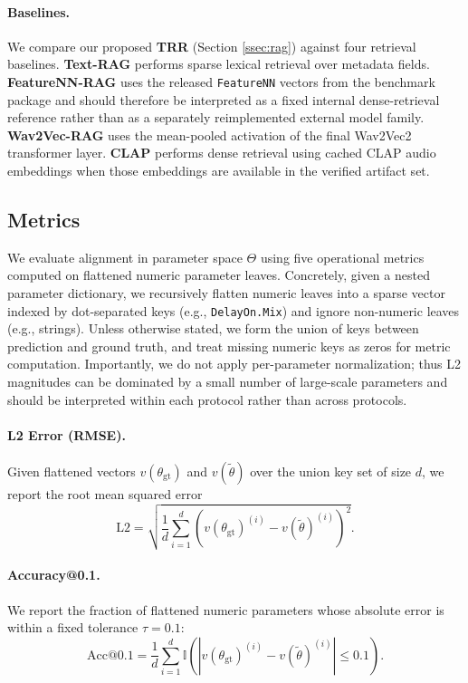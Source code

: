 \paragraph{Baselines.}
We compare our proposed \textbf{TRR} (Section \ref{ssec:rag}) against four retrieval baselines. \textbf{Text-RAG} performs sparse lexical retrieval over metadata fields. \textbf{FeatureNN-RAG} uses the released \texttt{FeatureNN} vectors from the benchmark package and should therefore be interpreted as a fixed internal dense-retrieval reference rather than as a separately reimplemented external model family. \textbf{Wav2Vec-RAG} uses the mean-pooled activation of the final Wav2Vec2 transformer layer. \textbf{CLAP} performs dense retrieval using cached CLAP audio embeddings when those embeddings are available in the verified artifact set.

\subsection{Metrics}
\label{ssec:metrics}
We evaluate alignment in parameter space $\Theta$ using five operational metrics computed on flattened numeric parameter leaves. Concretely, given a nested parameter dictionary, we recursively flatten numeric leaves into a sparse vector indexed by dot-separated keys (e.g., \texttt{DelayOn.Mix}) and ignore non-numeric leaves (e.g., strings). Unless otherwise stated, we form the union of keys between prediction and ground truth, and treat missing numeric keys as zeros for metric computation. Importantly, we do not apply per-parameter normalization; thus L2 magnitudes can be dominated by a small number of large-scale parameters and should be interpreted within each protocol rather than across protocols.

\paragraph{L2 Error (RMSE).}
Given flattened vectors $v(\theta_{\text{gt}})$ and $v(\tilde{\theta})$ over the union key set of size $d$, we report the root mean squared error
\begin{equation}
	\text{L2} = \sqrt{\frac{1}{d}\sum_{i=1}^{d}\left(v(\theta_{\text{gt}})^{(i)} - v(\tilde{\theta})^{(i)}\right)^2}.
\end{equation}

\paragraph{Accuracy@0.1.}
We report the fraction of flattened numeric parameters whose absolute error is within a fixed tolerance $\tau=0.1$:
\begin{equation}
	\text{Acc@0.1} = \frac{1}{d}\sum_{i=1}^{d}\mathbb{I}\left(\left|v(\theta_{\text{gt}})^{(i)} - v(\tilde{\theta})^{(i)}\right| \leq 0.1\right).
\end{equation}

